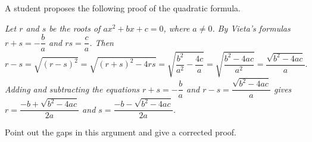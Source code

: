A student proposes the following proof of the quadratic formula.

\emph{Let $r$ and $s$ be the roots of $ax^2+bx+c=0$, where $a\ne0$. By Vieta's formulas $r+s=-\dfrac ba$ and $rs=\dfrac ca$. Then}
\[r-s=\sqrt{(r-s)^2}=\sqrt{(r+s)^2-4rs}=\sqrt{\dfrac{b^2}{a^2}-\dfrac{4c}{a}}=\sqrt{\dfrac{b^2-4ac}{a^2}}=\dfrac{\sqrt{b^2-4ac}}{a}.\]
\emph{Adding and subtracting the equations $r+s=-\dfrac ba$ and $r-s=\dfrac{\sqrt{b^2-4ac}}{a}$ gives $r=\dfrac{-b+\sqrt{b^2-4ac}}{2a}$ and $s=\dfrac{-b-\sqrt{b^2-4ac}}{2a}$.}

Point out the gaps in this argument and give a corrected proof.
